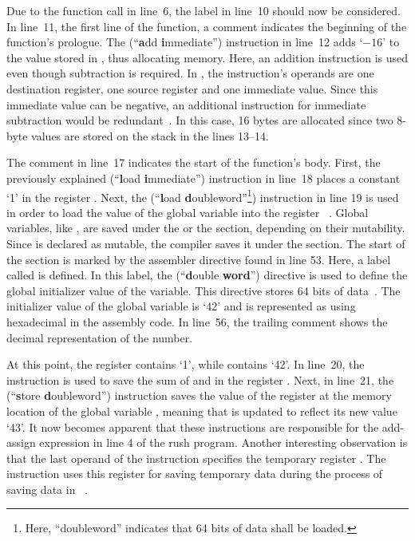 Due to the function call in line~6, the  label in line~10 should now be considered.
In line~11, the first line of the  function, a comment indicates the beginning of the function's prologue.
The  (\enquote{\textbf{a}dd \textbf{i}mmediate}) instruction in line~12 adds `$-16$' to the value stored in , thus allocating memory.
Here, an addition instruction is used even though subtraction is required.
In \riscv{}, the  instruction's operands are one destination register, one source register and one immediate value.
Since this immediate value can be negative, an additional instruction for immediate subtraction would be redundant~\cite[Reference Card]{Patterson2017}.
In this case, 16 bytes are allocated since two 8-byte values are stored on the stack in the lines 13--14.

The comment in line~17 indicates the start of the function's body.
First, the previously explained  (\enquote{\textbf{l}oad \textbf{i}mmediate}) instruction in line~18 places a constant `1' in the register .
Next, the  (\enquote{\textbf{l}oad \textbf{d}oubleword}\footnote{Here, \enquote{doubleword} indicates that 64 bits of data shall be loaded.}) instruction in line 19 is used in order to load the value of the global variable  into the register ~\cite[Reference Card]{Patterson2017}.
Global variables, like , are saved under the  or the  section, depending on their mutability.
Since  is declared as mutable, the compiler saves it under the  section.
The start of the  section is marked by the  assembler directive found in line 53.
Here, a label called  is defined.
In this label, the  (\enquote{\textbf{d}ouble \textbf{word}}) directive is used to define the global initializer value of the variable.
This directive stores 64 bits of data~\cite[p.~39]{Patterson2017}.
The initializer value of the global variable is `42' and is represented as  using hexadecimal in the assembly code.
In line~56, the trailing comment shows the decimal representation of the number.

At this point, the register  contains `1', while  contains `42'.
In line~20, the  instruction is used to save the sum of  and  in the register .
Next, in line~21, the  (\enquote{\textbf{s}tore \textbf{d}oubleword}) instruction saves the value of the register  at the memory location of the global variable ,
meaning that  is updated to reflect its new value `43'.
It now becomes apparent that these instructions are responsible for the add-assign expression in line 4 of the rush program.
Another interesting observation is that the last operand of the  instruction specifies the temporary register .
The instruction uses this register for saving temporary data during the process of saving data in ~\cite[Reference Card]{Patterson2017}.

